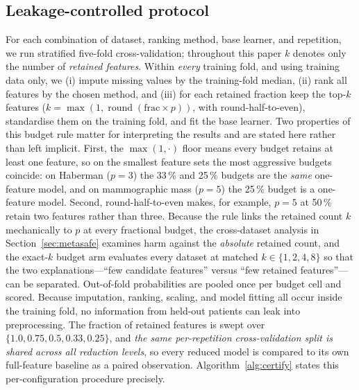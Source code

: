 \documentclass[fleqn,10pt]{wlscirep}
\newcommand{\result}[1]{#1}
\begin{document}
\subsection{Leakage-controlled protocol}
For each combination of dataset, ranking method, base learner, and repetition, we run stratified
five-fold cross-validation; throughout this paper $k$ denotes only the number of \emph{retained
features}. Within \emph{every} training fold, and using training data only, we
(i) impute missing values by the training-fold median, (ii) rank all features by the chosen
method, and (iii) for each retained fraction keep the top-$k$ features
($k=\max(1,\operatorname{round}(\mathrm{frac}\times p))$, with round-half-to-even), standardise them
on the training fold, and fit the base learner. Two properties of this budget rule matter for
interpreting the results and are stated here rather than left implicit. First, the $\max(1,\cdot)$
floor means every budget retains at least one feature, so on the smallest feature sets the most
aggressive budgets coincide: on Haberman ($p=3$) the \result{33\,\%} and \result{25\,\%} budgets are
the \emph{same} one-feature model, and on mammographic mass ($p=5$) the \result{25\,\%} budget is a
one-feature model. Second, round-half-to-even makes, for example, $p=5$ at \result{50\,\%} retain two
features rather than three. Because the rule links the retained count $k$ mechanically to $p$ at
every fractional budget, the cross-dataset analysis in Section~\ref{sec:metasafe} examines harm
against the \emph{absolute} retained count, and the exact-$k$ budget arm evaluates every dataset at
matched $k\in\{1,2,4,8\}$ so that the two explanations---``few candidate features'' versus ``few
retained features''---can be separated. Out-of-fold probabilities are pooled once per budget cell
and scored. Because
imputation, ranking, scaling, and model fitting all occur inside the training fold, no
information from held-out patients can leak into preprocessing. The fraction of retained
features is swept over $\{1.0, 0.75, 0.5, 0.33, 0.25\}$, and \emph{the same per-repetition
cross-validation split is shared across all reduction levels}, so every reduced model is
compared to its own full-feature baseline as a paired observation. Algorithm~\ref{alg:certify} states
this per-configuration procedure precisely.
\end{document}
